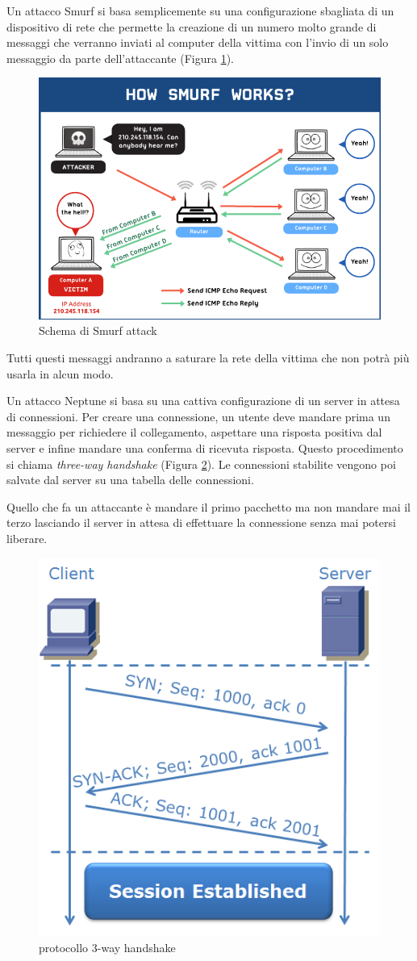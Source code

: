 \documentclass[12pt]{article}
\begin{document}
			Un attacco Smurf si basa semplicemente su una configurazione sbagliata di un dispositivo di rete che permette la creazione di un numero molto grande di messaggi che verranno inviati al computer della vittima con l'invio di un solo messaggio  da parte dell'attaccante (Figura \ref{fig:smurf}).			
			\begin{figure}
				\begin{center}
					\includegraphics[width=.7\textwidth]{smurf}
					\caption{Schema di Smurf attack}
					\label{fig:smurf}
				\end{center}
			\end{figure}
			Tutti questi messaggi andranno a saturare la rete della vittima che non potrà più usarla in alcun modo.
			
			Un attacco Neptune si basa su una cattiva configurazione di un server in attesa di connessioni. Per creare una connessione, un utente deve mandare prima un messaggio per richiedere il collegamento, aspettare una risposta positiva dal server e infine mandare una conferma di ricevuta risposta. Questo procedimento si chiama \emph{three-way handshake} (Figura \ref{fig:3way}). Le connessioni stabilite vengono poi salvate dal server su una tabella delle connessioni.
			
			Quello che fa un attaccante è mandare il primo pacchetto ma non mandare mai il terzo lasciando il server in attesa di effettuare la connessione senza mai potersi liberare.
			\begin{figure}
				\begin{center}
					\includegraphics[width=.4\textwidth]{3wayh}
					\caption{protocollo 3-way handshake}
					\label{fig:3way}
				\end{center}
			\end{figure}
			
\end{document}
